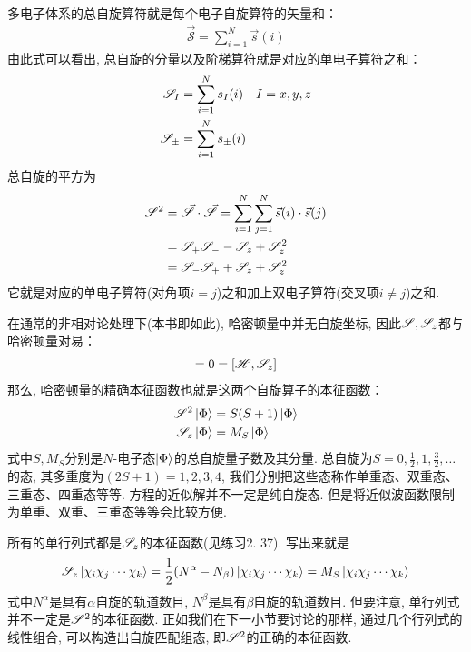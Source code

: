 多电子体系的总自旋算符就是每个电子自旋算符的矢量和：
\begin{align}
\vec{\mathscr{S}} = \sum_{i=1}^{N}\vec{s}(i)
\end{align}
由此式可以看出, 
总自旋的分量以及阶梯算符就是对应的单电子算符之和：
\begin{subequations}
	\begin{align}
	\mathscr{S}_I   & = \sum_{i=1}^{N}s_I(i)\quad I=x,y,z\\
	\mathscr{S}_\pm & = \sum_{i=1}^{N}s_\pm(i) 
	\end{align}
\end{subequations}
总自旋的平方为
\begin{align}
\mathscr{S}^2 & = \vec{\mathscr{S}}\cdot\vec{\mathscr{S}} = \sum_{i=1}^{N}\sum_{j=1}^{N} \vec{s}(i)\cdot\vec{s}(j) \notag \\
      & = \mathscr{S}_+\mathscr{S}_- - \mathscr{S}_z + \mathscr{S}^2_z\notag\\
      & = \mathscr{S}_-\mathscr{S}_+ + \mathscr{S}_z + \mathscr{S}^2_z
\end{align}
它就是对应的单电子算符(对角项$i=j$)之和加上双电子算符(交叉项$i\neq j$)之和.


在通常的非相对论处理下(本书即如此), 
哈密顿量中并无自旋坐标, 
因此$\mathscr{S},\mathscr{S}_z$都与哈密顿量对易：
\begin{align}
[\hs \ts^2] = 0 = [\hs,\ts_z]
\end{align} 
那么, 
哈密顿量的精确本征函数也就是这两个自旋算子的本征函数：
\begin{subequations}
	\begin{align}
	\mathscr{S}^2\Ket{\Phi} & = S(S+1)\Ket{\Phi}\\
	\mathscr{S}_z\Ket{\Phi} & = M_S\Ket{\Phi}
	\end{align}
\end{subequations}
式中$S,M_S$分别是$N$-电子态$\Ket{\Phi}$的总自旋量子数及其分量. 
总自旋为$S=0,\frac{1}{2},1,\frac{3}{2},\ldots$的态, 
其多重度为$(2S+1)=1,2,3,4$, 
我们分别把这些态称作单重态、双重态、三重态、四重态等等. 
\sch 方程的近似解并不一定是纯自旋态. 
但是将近似波函数限制为单重、双重、三重态等等会比较方便.


所有的单行列式都是$\mathscr{S}_z$的本征函数(见练习2.
37). 
写出来就是
\begin{align}
\mathscr{S}_z\Ket{\chi_i\chi_j\cdots\chi_k} = \frac{1}{2}(N^\alpha - N_\beta)\Ket{\chi_i\chi_j\cdots\chi_k} = M_S\Ket{\chi_i\chi_j\cdots\chi_k}
\end{align}
式中$N^\alpha$是具有$\alpha$自旋的轨道数目, 
$N^\beta$是具有$\beta$自旋的轨道数目. 
但要注意, 
单行列式并不一定是$\mathscr{S}^2$的本征函数. 
正如我们在下一小节要讨论的那样, 
通过几个行列式的线性组合, 
可以构造出自旋匹配组态, 
即$\mathscr{S}^2$的正确的本征函数.

